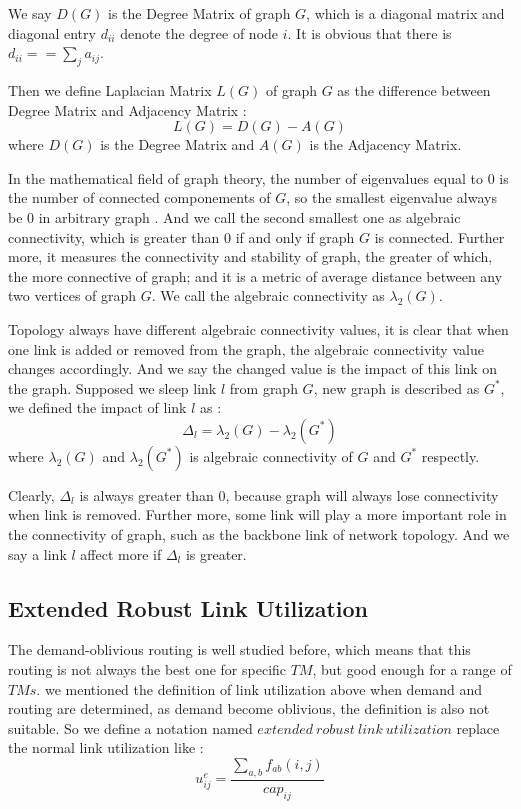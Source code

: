 \documentclass[conference]{IEEEtran}
\begin{document}
We say $D(G)$ is the Degree Matrix of graph $G$, which is a diagonal matrix and diagonal entry $d_{ii}$ denote 
the degree of node $i$. It is obvious that there is $d_{ii} == \sum_{j} a_{ij}$.


Then we define Laplacian Matrix $L(G)$ of graph $G$ as the difference between Degree Matrix and Adjacency Matrix :
\begin{equation}
	L(G) = D(G) - A(G)
\end{equation}
where $D(G)$ is the Degree Matrix and $A(G)$ is the Adjacency Matrix.


In the mathematical field of graph theory, the number of eigenvalues equal to 0 is the number of connected 
componements of $G$, so the smallest eigenvalue always be 0 in arbitrary graph . And we call the second smallest one as
algebraic connectivity, which is greater than 0 if and only if graph $G$ is connected. Further more,  
it measures the connectivity and stability of graph, the greater of which, the more connective of graph;
and it is a metric of average distance between any two vertices of graph $G$. We call the algebraic connectivity as
$\lambda_2(G)$.


Topology always have different algebraic connectivity values, it is clear that when one link is added or 
removed from the graph, the algebraic connectivity value changes accordingly. And we say the changed value
is the impact of this link on the graph. Supposed we sleep link $l$ from graph $G$, new graph is described as $G^*$, 
we defined the impact of link $l$ as :
\begin{equation}
	\Delta_l = \lambda_2(G) - \lambda_2(G^*)
\end{equation}
where $\lambda_2(G)$ and $\lambda_2(G^*)$ is algebraic connectivity of $G$ and $G^*$ respectly.


Clearly, $\Delta_l$ is always greater than 0, because graph will always lose connectivity when link is removed.
Further more, some link will play a more important role in the connectivity of graph, such as the backbone link 
of network topology. And we say a link $l$ affect more if $\Delta_l$ is greater.

\subsection{Extended Robust Link Utilization}
The demand-oblivious routing is well studied before, which means that this routing is not always the best one for 
specific $TM$, but good enough for a range of $TMs$. we mentioned the definition of link utilization above when 
demand and routing are determined, as demand become oblivious, the definition is also not suitable. So we define
a notation named $extended\ robust\ link\ utilization$ replace the normal link utilization like :
\begin{equation}
	u^e_{ij} = \frac {\sum_{a,b}f_{ab}(i,j)} {cap_{ij}}
\end{equation}
\end{document}
